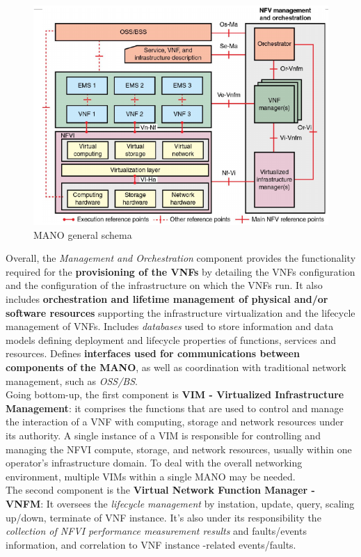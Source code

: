 \documentclass[10pt,a4paper]{report}
\theoremstyle{definition}
\begin{document}
\begin{figure}[h]
	\centering\includegraphics[scale=0.50]{images/Pasted image 20230405173054.png}
	\caption{MANO general schema}
\label{mano-general}
\end{figure}
Overall, the \textit{Management and Orchestration} component provides the functionality required for the \textbf{provisioning of the VNFs} by detailing the VNFs configuration and the configuration of the infrastructure on which the VNFs run. It also includes \textbf{orchestration and lifetime management of physical and/or software resources} supporting the infrastructure virtualization and the lifecycle management of VNFs.
Includes \textit{databases} used to store information and data models defining deployment and lifecycle properties of functions, services and resources.
Defines \textbf{interfaces used for communications between components of the MANO}, as well as coordination with traditional network management, such as \textit{OSS/BS}.\\
Going bottom-up,  the first component is \textbf{VIM - Virtualized Infrastructure Management}: it comprises the functions that are used to control and manage the interaction of a VNF with computing, storage and network resources under its authority.
A single instance of a VIM is responsible for controlling and managing the NFVI compute, storage, and network resources, usually within one operator’s infrastructure domain. To deal with the overall networking environment, multiple VIMs within a single MANO may be needed.\\
The second component is the \textbf{Virtual Network Function Manager - VNFM}: It oversees the \textit{lifecycle management} by instation, update, query, scaling up/down, terminate of VNF instance. It's also under its responsibility the \textit{collection of NFVI performance measurement results} and faults/events information, and correlation to VNF instance -related events/faults.
\end{document}
